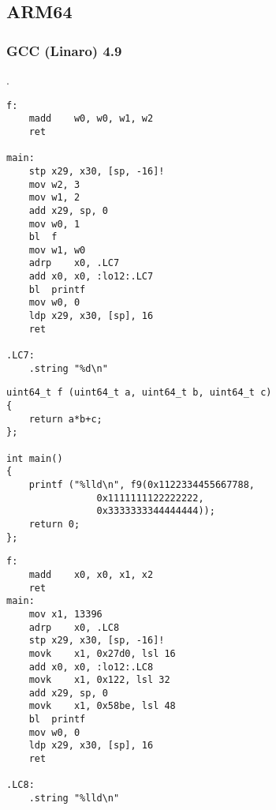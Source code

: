 ﻿\subsection{ARM64}

\subsubsection{\Optimizing GCC (Linaro) 4.9}

.

\begin{lstlisting}
f:
	madd	w0, w0, w1, w2
	ret

main:
	stp	x29, x30, [sp, -16]!
	mov	w2, 3
	mov	w1, 2
	add	x29, sp, 0
	mov	w0, 1
	bl	f
	mov	w1, w0
	adrp	x0, .LC7
	add	x0, x0, :lo12:.LC7
	bl	printf
	mov	w0, 0
	ldp	x29, x30, [sp], 16
	ret

.LC7:
	.string	"%d\n"
\end{lstlisting}


\begin{lstlisting}
uint64_t f (uint64_t a, uint64_t b, uint64_t c)
{
	return a*b+c;
};

int main() 
{
	printf ("%lld\n", f9(0x1122334455667788, 
				0x1111111122222222, 
				0x3333333344444444));
	return 0;
};
\end{lstlisting}

\begin{lstlisting}
f:
	madd	x0, x0, x1, x2
	ret
main:
	mov	x1, 13396
	adrp	x0, .LC8
	stp	x29, x30, [sp, -16]!
	movk	x1, 0x27d0, lsl 16
	add	x0, x0, :lo12:.LC8
	movk	x1, 0x122, lsl 32
	add	x29, sp, 0
	movk	x1, 0x58be, lsl 48
	bl	printf
	mov	w0, 0
	ldp	x29, x30, [sp], 16
	ret

.LC8:
	.string	"%lld\n"
\end{lstlisting}

